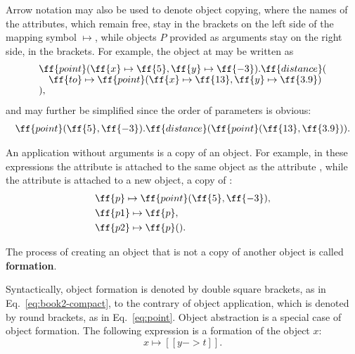 Arrow notation may also be used to denote object copying,
where the names of the attributes, which remain free, stay in the brackets
on the left side of the mapping symbol \(\mapsto\),
while objects \(P\) provided as arguments stay on the right side,
in the brackets. For example, the object at  may be written as
\begin{equation}\label{eq:point}
\begin{split}
& \ff{point}(\ff{x} \mapsto \ff{5}, \ff{y} \mapsto \ff{-3}).\ff{distance}(\br
& \quad \ff{to} \mapsto \ff{point}(\ff{x} \mapsto \ff{13}, \ff{y} \mapsto \ff{3.9}) \br
& ),
\end{split}
\end{equation}
and may further be simplified since the order of parameters is obvious:
\begin{equation}
\begin{split}
\ff{point}(\ff{5}, \ff{-3}).\ff{distance}(\ff{point}(\ff{13}, \ff{3.9})).
\end{split}
\end{equation}

An application without arguments is a copy of an object. For example,
in these expressions the attribute  is attached to the same object
as the attribute , while the attribute  is attached to a new
object, a copy of :
\begin{equation*}
\begin{split}
& \ff{p} \mapsto \ff{point}(\ff{5}, \ff{-3}),\\
& \ff{p1} \mapsto \ff{p},\\
& \ff{p2} \mapsto \ff{p}().\\
\end{split}
\end{equation*}

\begin{definition}\label{def:formation}
The process of creating an object that is not a copy of another object
is called \textbf{formation}.
\end{definition}

Syntactically, object formation is denoted by double square brackets,
as in Eq.~\ref{eq:book2-compact}, to the contrary of object application,
which is denoted by round brackets, as in Eq.~\ref{eq:point}.
Object abstraction is a special case of object formation.
The following expression is a formation of the object \(x\):
\begin{equation*}
x \mapsto [[ y -> t ]].
\end{equation*}

